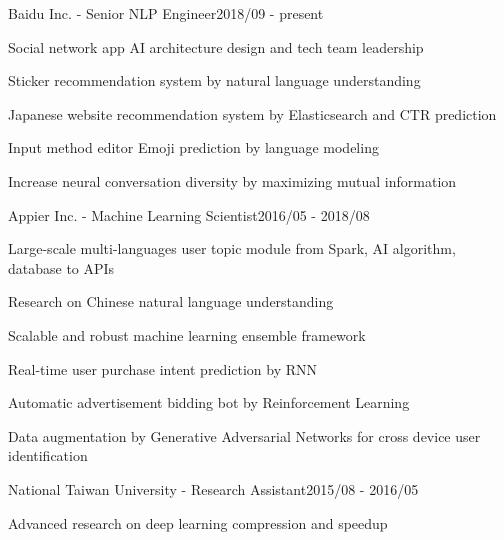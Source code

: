 \documentclass{joel_cv}
\begin{document}
\begin{cvHeader} 
\end{cvHeader}

%
%

\begin{profExp}{Baidu Inc. - Senior NLP Engineer}{2018/09 - present}
	\item Social network app AI architecture design and tech team leadership
	\item Sticker recommendation system by natural language understanding
	\item Japanese website recommendation system by Elasticsearch and CTR prediction
	\item Input method editor Emoji prediction by language modeling
	\item Increase neural conversation diversity by maximizing mutual information
\end{profExp}

\begin{profExp}{Appier Inc. - Machine Learning Scientist}{2016/05 - 2018/08}
	\item Large-scale multi-languages user topic module from Spark, AI algorithm, database to APIs
	\item Research on Chinese natural language understanding
	\item Scalable and robust machine learning ensemble framework
	\item Real-time user purchase intent prediction by RNN
	\item Automatic advertisement bidding bot by Reinforcement Learning
	\item Data augmentation by Generative Adversarial Networks for cross device user identification
\end{profExp}

\begin{profExp}{National Taiwan University - Research Assistant}{2015/08 - 2016/05}
	\item Advanced research on deep learning compression and speedup
\end{profExp}

\end{document}
